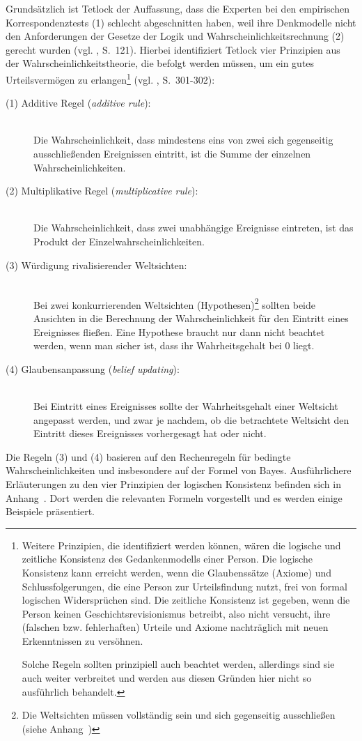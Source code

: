 Grundsätzlich ist Tetlock der Auffassung, dass die Experten bei den empirischen
Korrespondenztests (1) schlecht abgeschnitten haben, weil ihre Denkmodelle
nicht den Anforderungen der Gesetze der Logik und Wahrscheinlichkeitsrechnung 
(2) gerecht wurden (vgl. \cite{Tetlock}, S.~121). Hierbei identifiziert Tetlock
vier Prinzipien aus der Wahrscheinlichkeitstheorie, die befolgt werden müssen,
um ein gutes Urteilsvermögen zu erlangen\footnote{
Weitere Prinzipien, die identifiziert werden können, wären die logische und
zeitliche Konsistenz des Gedankenmodells einer Person. Die logische Konsistenz
kann erreicht werden, wenn die Glaubenssätze (Axiome) und Schlussfolgerungen,
die eine Person zur Urteilsfindung nutzt, frei von formal logischen
Widersprüchen sind. Die zeitliche Konsistenz ist gegeben, wenn die Person keinen
Geschichtsrevisionismus betreibt, also nicht versucht, ihre  (falschen bzw.
fehlerhaften) Urteile und Axiome nachträglich mit neuen Erkenntnissen zu
versöhnen.

Solche Regeln sollten prinzipiell auch beachtet werden, allerdings sind sie
auch weiter verbreitet und werden aus diesen Gründen hier nicht so ausführlich
behandelt.
} (vgl. \cite{Tetlock}, S.~301-302):
\begin{description}

\item[(1) Additive Regel (\emph{additive rule}):] \hfill \\
Die Wahrscheinlichkeit, dass mindestens eins von zwei sich gegenseitig
ausschließenden Ereignissen eintritt, ist die Summe der einzelnen
Wahrscheinlichkeiten.

\item[(2) Multiplikative Regel (\emph{multiplicative rule}):] \hfill \\
Die Wahrscheinlichkeit, dass zwei unabhängige Ereignisse eintreten, ist das
Produkt der Einzelwahrscheinlichkeiten.

\item[(3) Würdigung rivalisierender Weltsichten:] \hfill \\
Bei zwei konkurrierenden Weltsichten (Hypothesen)\footnote{
Die Weltsichten  müssen vollständig sein und sich gegenseitig
ausschließen (siehe Anhang~\xcom)
} sollten beide Ansichten in die Berechnung der Wahrscheinlichkeit für den
Eintritt eines Ereignisses fließen. Eine Hypothese braucht nur dann nicht
beachtet werden, wenn man sicher ist, dass ihr Wahrheitsgehalt bei 0 liegt.

\item[(4) Glaubensanpassung (\emph{belief updating}):] \hfill \\
Bei Eintritt eines Ereignisses sollte der Wahrheitsgehalt einer Weltsicht
angepasst werden, und zwar je nachdem, ob die betrachtete Weltsicht den Eintritt
dieses Ereignisses vorhergesagt hat oder nicht.

\end{description}
Die Regeln (3) und (4) basieren auf den Rechenregeln für bedingte
Wahrscheinlichkeiten und insbesondere auf der Formel von Bayes. Ausführlichere
Erläuterungen zu den vier Prinzipien der logischen Konsistenz befinden sich in
Anhang~\xcom. Dort werden die relevanten Formeln vorgestellt und es werden
einige Beispiele präsentiert.


